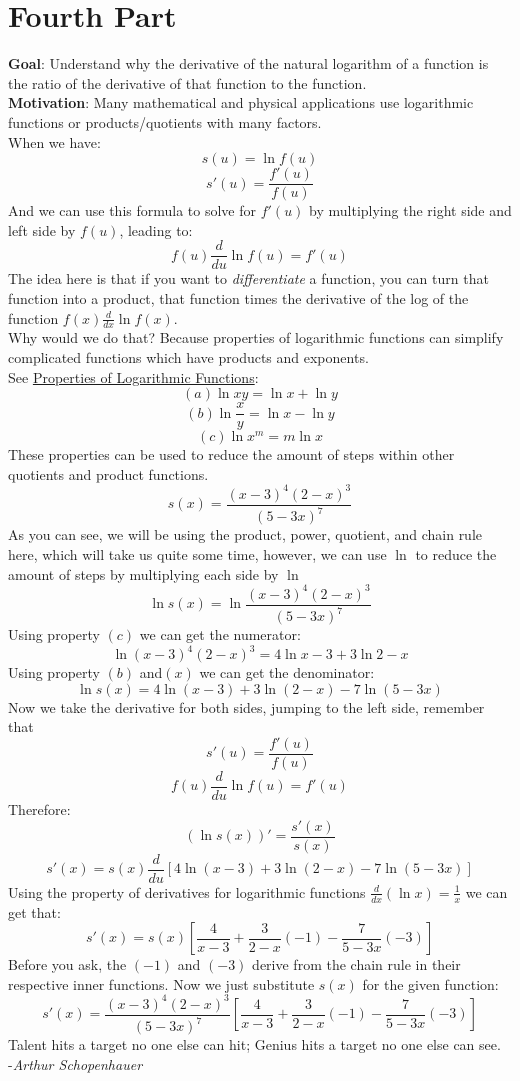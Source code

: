 \documentclass[12pt, letterpaper]{article}
\begin{document}
\section{Fourth Part}
\textbf{Goal}: Understand why the derivative of the natural logarithm of a function is the ratio of the derivative of that function to the function.\\
\newline
\textbf{Motivation}: Many mathematical and physical applications use logarithmic functions or products/quotients with many factors.\\
\newline
When we have:
\[s(u)=\ln{f(u)}\]
\[s'(u)=\frac{f'(u)}{f(u)}\]
And we can use this formula to solve for \(f'(u)\) by multiplying the right side and left side by \(f(u)\), leading to:
\[f(u)\frac{d}{du}\ln{f(u)}=f'(u)\]
The idea here is that if you want to \textit{differentiate} a function, you can turn that function into a product, that function times the derivative of the log of the function \(f(x)\frac{d}{dx}\ln{f(x)}\).\\
\newline
Why would we do that? Because properties of logarithmic functions can simplify complicated functions which have products and exponents.\\
See \underline{Properties of Logarithmic Functions}:
\[(a)\ln{xy}=\ln{x}+\ln{y}\]
\[(b)\ln{\frac{x}{y}}=\ln{x}-\ln{y}\]
\[(c)\ln{x^m}=m\ln{x}\]
These properties can be used to reduce the amount of steps within other quotients and product functions.
\[s(x)=\frac{(x-3)^4(2-x)^3}{(5-3x)^7}\]
As you can see, we will be using the product, power, quotient, and chain rule here, which will take us quite some time, however, we can use \(\ln\) to reduce the amount of steps by multiplying each side by \(\ln\)
\[\ln s(x)=\ln\frac{(x-3)^4(2-x)^3}{(5-3x)^7}\]
Using property \((c)\) we can get the numerator:
\[\ln(x-3)^4(2-x)^3 = 4\ln{x-3}+3\ln{2-x}\]
Using property \((b)\) and\((x)\) we can get the denominator:
\[\ln s(x) = 4\ln({x-3})+3\ln({2-x})-7\ln({5-3x})\]
Now we take the derivative for both sides, jumping to the left side, remember that
\[s'(u)=\frac{f'(u)}{f(u)}\]
\[f(u)\frac{d}{du}\ln{f(u)}=f'(u)\]
Therefore:
\[(\ln{s(x)})' = \frac{s'(x)}{s(x)}\] 
\[s'(x)=s(x)\frac{d}{du}[4\ln({x-3})+3\ln({2-x})-7\ln({5-3x})]\]
Using the property of derivatives for logarithmic functions \(\frac{d}{dx}(\ln{x})=\frac{1}{x}\) we can get that:
\[s'(x)=s(x)[\frac{4}{x-3}+\frac{3}{2-x}(-1)-\frac{7}{5-3x}(-3)]\]
Before you ask, the \((-1)\) and \((-3)\) derive from the chain rule in their respective inner functions. Now we just substitute \(s(x)\) for the given function:
\[s'(x)=\frac{(x-3)^4(2-x)^3}{(5-3x)^7}[\frac{4}{x-3}+\frac{3}{2-x}(-1)-\frac{7}{5-3x}(-3)]\]
\newline
Talent hits a target no one else can hit; Genius hits a target no one else can see.\\
-\textit{Arthur Schopenhauer}
\end{document}
